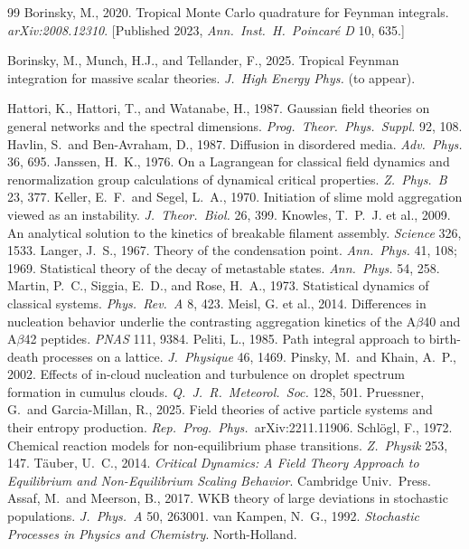 \documentclass[11pt,a4paper]{article}
\theoremstyle{plain}
\begin{document}
\begin{thebibliography}{99}
 Borinsky, M., 2020. Tropical Monte Carlo quadrature for Feynman integrals. \textit{arXiv:2008.12310}. [Published 2023, \textit{Ann.\ Inst.\ H.\ Poincar\'e D} 10, 635.]

 Borinsky, M., Munch, H.J., and Tellander, F., 2025. Tropical Feynman integration for massive scalar theories. \textit{J.\ High Energy Phys.} (to appear).

 Hattori, K., Hattori, T., and Watanabe, H., 1987. Gaussian field theories on general networks and the spectral dimensions. \textit{Prog.\ Theor.\ Phys.\ Suppl.} 92, 108.
 Havlin, S.\ and Ben-Avraham, D., 1987. Diffusion in disordered media. \textit{Adv.\ Phys.} 36, 695.
 Janssen, H.~K., 1976. On a Lagrangean for classical field dynamics and renormalization group calculations of dynamical critical properties. \textit{Z.\ Phys.\ B} 23, 377.
 Keller, E.~F.\ and Segel, L.~A., 1970. Initiation of slime mold aggregation viewed as an instability. \textit{J.\ Theor.\ Biol.} 26, 399.
 Knowles, T.~P.~J. et al., 2009. An analytical solution to the kinetics of breakable filament assembly. \textit{Science} 326, 1533.
 Langer, J.~S., 1967. Theory of the condensation point. \textit{Ann.\ Phys.} 41, 108; 1969. Statistical theory of the decay of metastable states. \textit{Ann.\ Phys.} 54, 258.
 Martin, P.~C., Siggia, E.~D., and Rose, H.~A., 1973. Statistical dynamics of classical systems. \textit{Phys.\ Rev.\ A} 8, 423.
 Meisl, G. et al., 2014. Differences in nucleation behavior underlie the contrasting aggregation kinetics of the A$\beta$40 and A$\beta$42 peptides. \textit{PNAS} 111, 9384.
 Peliti, L., 1985. Path integral approach to birth-death processes on a lattice. \textit{J.\ Physique} 46, 1469.
 Pinsky, M.\ and Khain, A.~P., 2002. Effects of in-cloud nucleation and turbulence on droplet spectrum formation in cumulus clouds. \textit{Q.\ J.\ R.\ Meteorol.\ Soc.} 128, 501.
 Pruessner, G.\ and Garcia-Millan, R., 2025. Field theories of active particle systems and their entropy production. \textit{Rep.\ Prog.\ Phys.}\ arXiv:2211.11906.
 Schl\"ogl, F., 1972. Chemical reaction models for non-equilibrium phase transitions. \textit{Z.\ Physik} 253, 147.
 T\"auber, U.~C., 2014. \textit{Critical Dynamics: A Field Theory Approach to Equilibrium and Non-Equilibrium Scaling Behavior}. Cambridge Univ.\ Press.
 Assaf, M.\ and Meerson, B., 2017. WKB theory of large deviations in stochastic populations. \textit{J.\ Phys.\ A} 50, 263001.
 van Kampen, N.~G., 1992. \textit{Stochastic Processes in Physics and Chemistry}. North-Holland.

\end{thebibliography}
\end{document}
